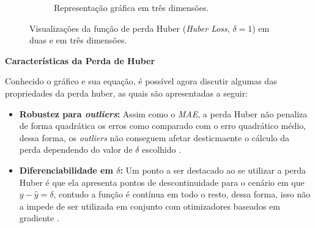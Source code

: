 \begin{figure}[h!]
\begin{subfigure}[b]{0.48\textwidth}
        \caption{Representação gráfica em três dimensões.} %
        \label{fig:huber-3d}
    \end{subfigure}

    \caption{Visualizações da função de perda Huber (\textit{Huber Loss}, $\delta=1$) em duas e em três dimensões.}
    \label{fig:huber-loss} %
\end{figure}

\textbf{Características da Perda de Huber}
\vspace{1em}

Conhecido o gráfico e sua equação, é possível agora discutir algumas das propriedades da perda huber, as quais são apresentadas a seguir:

\begin{itemize}
    \item \textbf{Robustez para \textit{outliers}:} Assim como o \textit{MAE}, a perda Huber não penaliza de forma quadrática os erros como comparado com o erro quadrático médio, dessa forma, os \textit{outliers} não conseguem afetar desticmaente o cálculo da perda dependendo do valor de $\delta$ escolhido \parencite{LossesArticle}.
    \item \textbf{Diferenciabilidade em $\delta$:} Um ponto a ser destacado ao se utilizar a perda Huber é que ela apresenta pontos de descontinuidade para o cenário em que $y - \hat{y} = \delta$, contudo a função é contínua em todo o resto, dessa forma, isso não a impede de ser utilizada em conjunto com otimizadores baseados em gradiente \parencite{LossesArticle}.
\end{itemize}

